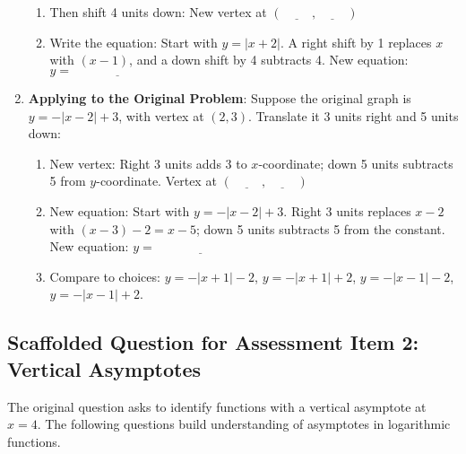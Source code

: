 \documentclass[12pt]{article}
\begin{document}
\begin{enumerate}[label=1.\arabic*]
\begin{enumerate}[label=\alph*)]
        \item Then shift 4 units down: New vertex at \( (\underline{\hspace{1cm}}, \underline{\hspace{1cm}}) \)
        \item Write the equation: Start with \( y = |x + 2| \). A right shift by 1 replaces \( x \) with \( (x - 1) \), and a down shift by 4 subtracts 4. New equation: \( y = \underline{\hspace{3cm}} \)
    \end{enumerate}
    \item \textbf{Applying to the Original Problem}: Suppose the original graph is \( y = -|x - 2| + 3 \), with vertex at \( (2, 3) \). Translate it 3 units right and 5 units down:
    \begin{enumerate}[label=\alph*)]
        \item New vertex: Right 3 units adds 3 to \( x \)-coordinate; down 5 units subtracts 5 from \( y \)-coordinate. Vertex at \( (\underline{\hspace{1cm}}, \underline{\hspace{1cm}}) \)
        \item New equation: Start with \( y = -|x - 2| + 3 \). Right 3 units replaces \( x - 2 \) with \( (x - 3) - 2 = x - 5 \); down 5 units subtracts 5 from the constant. New equation: \( y = \underline{\hspace{3cm}} \)
        \item Compare to choices: \( y = -|x + 1| - 2 \), \( y = -|x + 1| + 2 \), \( y = -|x - 1| - 2 \), \( y = -|x - 1| + 2 \).
    \end{enumerate}
\end{enumerate}

\subsection*{Scaffolded Question for Assessment Item 2: Vertical Asymptotes}
The original question asks to identify functions with a vertical asymptote at \( x = 4 \). The following questions build understanding of asymptotes in logarithmic functions.
\end{document}
